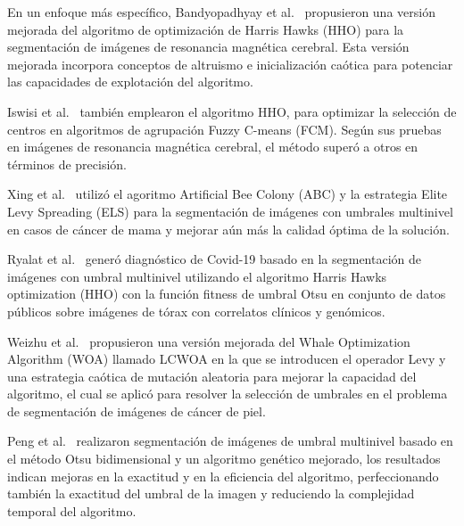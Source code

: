 \documentclass[conference]{IEEEtran}
\begin{document}

\noindent En un enfoque más específico, Bandyopadhyay et al.~\cite{Bandyopadhyay2021} propusieron una versión mejorada del algoritmo de optimización de Harris Hawks (HHO) para la segmentación de imágenes de resonancia magnética cerebral. Esta versión mejorada incorpora conceptos de altruismo e inicialización caótica para potenciar las capacidades de explotación del algoritmo.

\noindent Iswisi et al.~\cite{Iswisi2021} también emplearon el algoritmo HHO, para optimizar la selección de centros en algoritmos de agrupación Fuzzy C-means (FCM). Según sus pruebas en imágenes de resonancia magnética cerebral, el método superó a otros en términos de precisión.


\noindent Xing et al.~\cite{Xing2023} utilizó el agoritmo Artificial Bee Colony (ABC) y la estrategia Elite Levy Spreading (ELS) para la segmentación de imágenes con umbrales multinivel en casos de cáncer de mama y mejorar aún más la calidad óptima de la solución.

\noindent Ryalat et al.~\cite{Ryalat2022} generó diagnóstico de Covid-19 basado en la segmentación de imágenes con umbral multinivel utilizando el algoritmo Harris Hawks optimization (HHO) con la función fitness de umbral Otsu en conjunto de datos públicos sobre imágenes de tórax con correlatos clínicos y genómicos.

\noindent Weizhu et al.~\cite{Weizhu2022} propusieron una versión mejorada del Whale Optimization Algorithm (WOA) llamado LCWOA en la que se introducen el operador Levy y una estrategia caótica de mutación aleatoria para mejorar la capacidad del algoritmo, el cual se aplicó para resolver la selección de umbrales en el problema de segmentación de imágenes de cáncer de piel.

\noindent Peng et al.~\cite{Peng2023} realizaron segmentación de imágenes de umbral multinivel basado en el método Otsu bidimensional y un algoritmo genético mejorado, los resultados indican mejoras en la exactitud y en la eficiencia del algoritmo, perfeccionando también la exactitud del umbral de la imagen y reduciendo la complejidad temporal del algoritmo.
\end{document}
